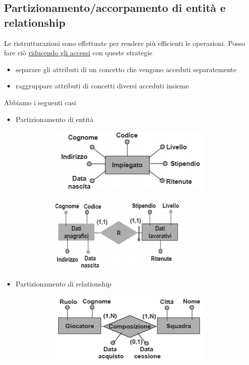 \subsection{Partizionamento/accorpamento di entità e relationship}
Le ristrutturazioni sono effettuate per rendere più efficienti le operazioni. Posso fare ciò \underline{riducendo gli accessi} con queste strategie
\begin{itemize}
	\item separare gli attributi di un concetto che vengono acceduti separatemente
	\item raggruppare attributi di concetti diversi acceduti insieme
\end{itemize}
Abbiamo i seguenti casi
\begin{itemize}
	\item Partizionamento di entità
	\begin{figure}[h]
		\begin{subfigure}{0.5\textwidth}
			\includegraphics{images/116.PNG} 
		\end{subfigure}
		\begin{subfigure}{0.5\textwidth}
			\includegraphics{images/117.PNG}
		\end{subfigure}
	\end{figure}
	\item Partizionamento di relationship
	\begin{figure}[h]
		\begin{subfigure}{0.5\textwidth}
			\includegraphics{images/120.PNG} 

\end{subfigure}
\end{figure}
\end{itemize}
